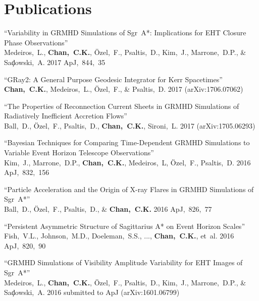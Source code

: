 \section*{Publications}

\begin{ilist}

\item ``Variability in GRMHD Simulations of Sgr~A*: Implications for EHT Closure Phase Observations''\\
  Medeiros,~L., \textbf{Chan,~C.K.}, {\"O}zel,~F., Psaltis,~D., Kim,~J., Marrone,~D.P., \& Sa{\c d}owski,~A.
  2017 ApJ,~844,~35

\item ``GRay2: A General Purpose Geodesic Integrator for Kerr Spacetimes''\\
  \textbf{Chan,~C.K.}, Medeiros,~L., {\"O}zel,~F., \& Psaltis,~D.
  2017 (arXiv:1706.07062)

\item ``The Properties of Reconnection Current Sheets in GRMHD Simulations of Radiatively Inefficient Accretion Flows''\\
  Ball,~D., {\"O}zel,~F., Psaltis,~D., \textbf{Chan,~C.K.}, Sironi,~L.
  2017 (arXiv:1705.06293)

\item ``Bayesian Techniques for Comparing Time-Dependent GRMHD Simulations to Variable Event Horizon Telescope Observations''\\
  Kim,~J., Marrone,~D.P., \textbf{Chan,~C.K.}, Medeiros,~L, {\"O}zel,~F., Psaltis,~D.
  2016 ApJ,~832,~156

\item ``Particle Acceleration and the Origin of X-ray Flares in GRMHD Simulations of Sgr~A*''\\
  Ball,~D., {\"O}zel,~F., Psaltis,~D., \& \textbf{Chan,~C.K.}
  2016 ApJ,~826,~77

\item ``Persistent Asymmetric Structure of Sagittarius A* on Event Horizon Scales''\\
  Fish,~V.L., Johnson,~M.D., Doeleman,~S.S., ..., \textbf{Chan,~C.K.}, et~al.
  2016 ApJ,~820,~90

\item ``GRMHD Simulations of Visibility Amplitude Variability for EHT Images of Sgr~A*''\\
  Medeiros,~L., \textbf{Chan,~C.K.}, {\"O}zel,~F., Psaltis,~D., Kim,~J., Marrone,~D.P., \& Sa{\c d}owski,~A.
  2016 submitted to ApJ (arXiv:1601.06799)


\end{ilist}
